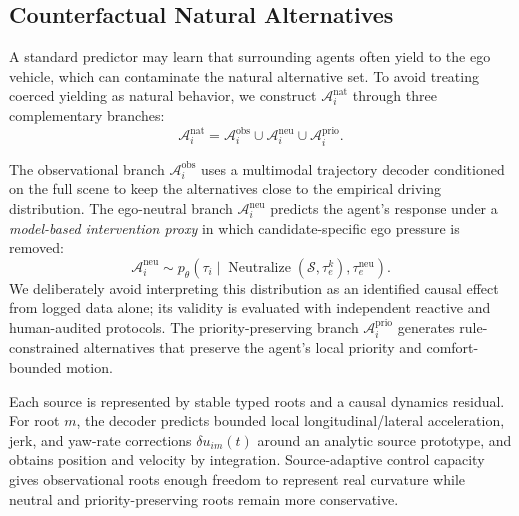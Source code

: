 \documentclass[10pt]{article}
\begin{document}
\subsection{Counterfactual Natural Alternatives}
\label{sec:method_counterfactual}

A standard predictor may learn that surrounding agents often yield to the ego vehicle, which can contaminate the natural alternative set. To avoid treating coerced yielding as natural behavior, we construct $\mathcal{A}^{\mathrm{nat}}_i$ through three complementary branches:
\begin{equation}
    \mathcal{A}^{\mathrm{nat}}_i
    =
    \mathcal{A}^{\mathrm{obs}}_i
    \cup
    \mathcal{A}^{\mathrm{neu}}_i
    \cup
    \mathcal{A}^{\mathrm{prio}}_i .
    \label{eq:natural_union}
\end{equation}

The observational branch $\mathcal{A}^{\mathrm{obs}}_i$ uses a multimodal trajectory decoder conditioned on the full scene to keep the alternatives close to the empirical driving distribution. The ego-neutral branch $\mathcal{A}^{\mathrm{neu}}_i$ predicts the agent's response under a \emph{model-based intervention proxy} in which candidate-specific ego pressure is removed:
\begin{equation}
    \mathcal{A}^{\mathrm{neu}}_i
    \sim
    p_\theta\!\left(\tau_i \mid \operatorname{Neutralize}(\mathcal{S},\tau_e^k),\tau^{\mathrm{neu}}_e\right).
\end{equation}
We deliberately avoid interpreting this distribution as an identified causal effect from logged data alone; its validity is evaluated with independent reactive and human-audited protocols. The priority-preserving branch $\mathcal{A}^{\mathrm{prio}}_i$ generates rule-constrained alternatives that preserve the agent's local priority and comfort-bounded motion.

Each source is represented by stable typed roots and a causal dynamics residual. For root $m$, the decoder predicts bounded local longitudinal/lateral acceleration, jerk, and yaw-rate corrections $\delta u_{im}(t)$ around an analytic source prototype, and obtains position and velocity by integration. Source-adaptive control capacity gives observational roots enough freedom to represent real curvature while neutral and priority-preserving roots remain more conservative.
\end{document}
